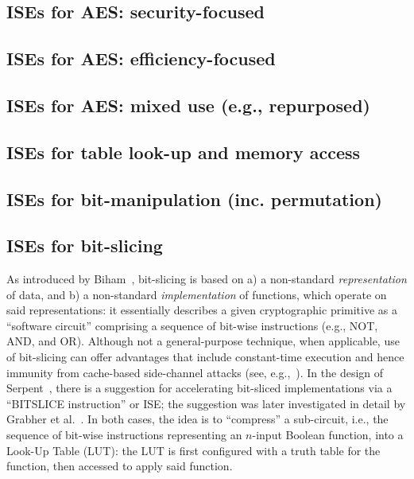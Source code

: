 \subsection*{ISEs for AES: security-focused}
\cite{SCARV:TilGro:07:a}
\subsection*{ISEs for AES: efficiency-focused}
\cite{SCARV:TilGroSze:05,SCARV:TilGro:06,SCARV:APRJ:11}
\subsection*{ISEs for AES: mixed use (e.g., repurposed)}
\cite{SCARV:TilGro:05,SCARV:TilGro:07:b,SCARV:BBGR:09,SCARV:BosOzeSta:11}

\subsection*{ISEs for table look-up and memory access}
\cite{SCARV:FisLee:01,SCARV:FisLee:05:a,SCARV:FisLee:05:b,SCARV:HilYinLee:08}
\subsection*{ISEs for bit-manipulation (inc. permutation)}
\cite{SCARV:ShiLee:00,SCARV:YanLee:00,SCARV:McGLee:01,SCARV:LeeShiYan:01,SCARV:ShiLee:02,SCARV:ShiYanLee:03,SCARV:LSYRR:04,SCARV:Shi:04,MASCAB:LeeYanShi:05,SCARV:HilYinLee:08,SCARV:HilLee:08,SCARV:ShiYanLee:08,SCARV:Hilewitz:08}
\subsection*{ISEs for bit-slicing}
As introduced by Biham~\cite{SCARV:Biham:97}, bit-slicing is based on
a) a non-standard {\em representation} of data,
   and
b) a non-standard {\em implementation} of functions, which operate on
   said representations:
it essentially describes a given cryptographic primitive as a  ``software 
circuit'' comprising a sequence of bit-wise instructions (e.g., NOT, AND, 
and OR).  Although not a general-purpose technique, when applicable, use
of bit-slicing can offer advantages that include constant-time execution 
and hence immunity from cache-based side-channel attacks
(see, e.g.,~\cite{SCARV:KasSch:09}).
In the design of Serpent~\cite[Page 232]{SCARV:BihAndKnu:98}, there is a
suggestion for accelerating bit-sliced implementations via a ``BITSLICE 
instruction'' or ISE; the suggestion was later investigated in detail by 
Grabher et al.~\cite{SCARV:GraGroPag:08}.  In both cases, the idea is to 
``compress'' a sub-circuit, i.e., the sequence of bit-wise instructions 
representing an $n$-input Boolean function, into a Look-Up Table (LUT): 
the LUT is first configured with a truth table for the function, then 
accessed to apply said function.  

